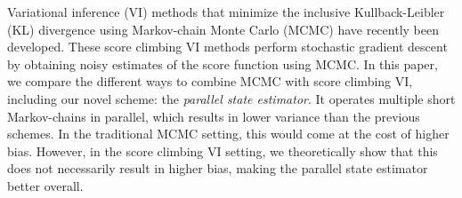 
Variational inference (VI) methods that minimize the inclusive Kullback-Leibler (KL) divergence using Markov-chain Monte Carlo (MCMC) have recently been developed.
These score climbing VI methods perform stochastic gradient descent by obtaining noisy estimates of the score function using MCMC.
In this paper, we compare the different ways to combine MCMC with score climbing VI, including our novel scheme: the \textit{parallel state estimator}.
It operates multiple short Markov-chains in parallel, which results in lower variance than the previous schemes.
In the traditional MCMC setting, this would come at the cost of higher bias.
However, in the score climbing VI setting, we theoretically show that this does not necessarily result in higher bias, making the parallel state estimator better overall.


